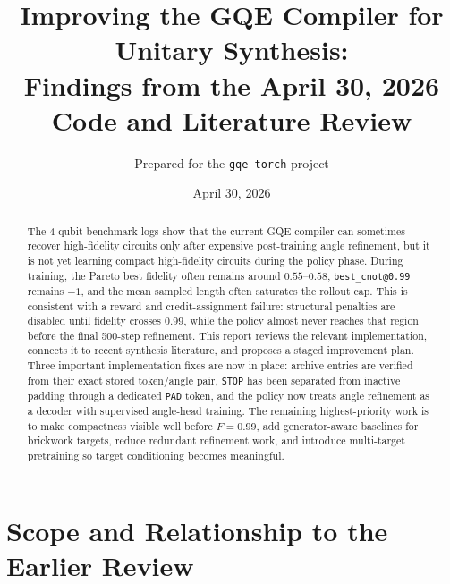 \documentclass[11pt]{article}
\title{Improving the GQE Compiler for Unitary Synthesis:\\
Findings from the April 30, 2026 Code and Literature Review}
\author{Prepared for the \texttt{gqe-torch} project}
\date{April 30, 2026}
\begin{document}
\maketitle

\begin{abstract}
The 4-qubit benchmark logs show that the current GQE compiler can sometimes
recover high-fidelity circuits only after expensive post-training angle
refinement, but it is not yet learning compact high-fidelity circuits during the
policy phase.  During training, the Pareto best fidelity often remains around
\(0.55\)--\(0.58\), \texttt{best\_cnot@0.99} remains \(-1\), and the mean sampled
length often saturates the rollout cap.  This is consistent with a reward and
credit-assignment failure: structural penalties are disabled until fidelity
crosses \(0.99\), while the policy almost never reaches that region before the
final 500-step refinement.  This report reviews the relevant implementation,
connects it to recent synthesis literature, and proposes a staged improvement
plan.  Three important implementation fixes are now in place: archive entries
are verified from their exact stored token/angle pair, \texttt{STOP} has been
separated from inactive padding through a dedicated \texttt{PAD} token, and the
policy now treats angle refinement as a decoder with supervised angle-head
training.  The remaining highest-priority work is to make compactness visible
well before \(F=0.99\), add generator-aware baselines for brickwork targets,
reduce redundant refinement work, and introduce multi-target pretraining so
target conditioning becomes meaningful.
\end{abstract}

\section{Scope and Relationship to the Earlier Review}
\end{document}
